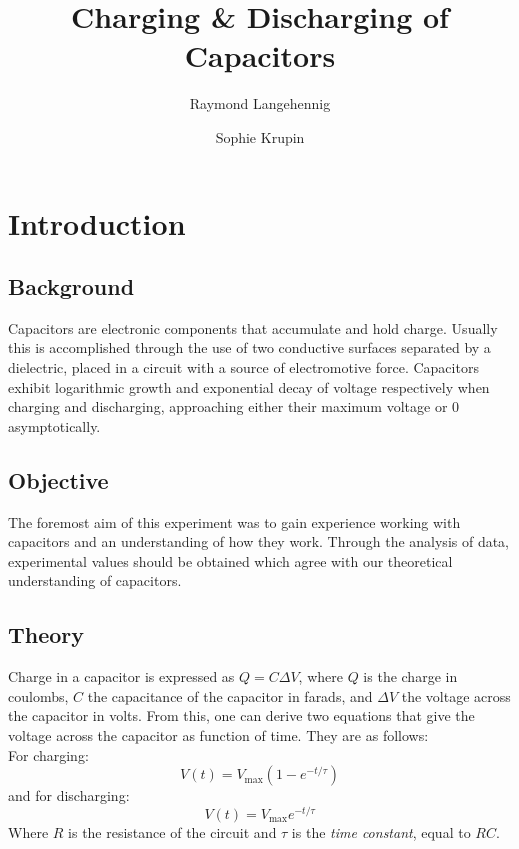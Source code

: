 \documentclass{article}
\title{Charging \& Discharging of Capacitors}
\author{Raymond Langehennig \and Sophie Krupin}
\begin{document}
\maketitle

\section{Introduction}
	\subsection{Background}
	Capacitors are electronic components that accumulate and hold charge.
	Usually this is accomplished through the use of two conductive surfaces separated by a dielectric, placed in a circuit with a source of electromotive force.
	Capacitors exhibit logarithmic growth and exponential decay of voltage respectively when charging and discharging, approaching either their maximum voltage or 0 asymptotically.
	
	\subsection{Objective}
	The foremost aim of this experiment was to gain experience working with capacitors and an understanding of how they work.
	Through the analysis of data, experimental values should be obtained which agree with our theoretical understanding of capacitors.
		
	\subsection{Theory}
	Charge in a capacitor is expressed as $Q = C\Delta V$, where $Q$ is the charge in coulombs, $C$ the capacitance of the capacitor in farads, and $\Delta V$ the voltage across the capacitor in volts.
	From this, one can derive two equations that give the voltage across the capacitor as function of time.	They are as follows:\\
	For charging:
	\[
	V(t) = V_\mathrm{max}(1-e^{-t/\tau})
	\]
	and for discharging:
	\[
	V(t) = V_\mathrm{max}e^{-t/\tau}
	\]
	Where $R$ is the resistance of the circuit and $\tau$ is the \emph{time constant}, equal to $RC$.
	
	
	
\end{document}
